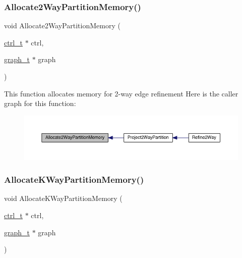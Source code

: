 \subsubsection{\texorpdfstring{Allocate2\+Way\+Partition\+Memory()}{Allocate2WayPartitionMemory()}}
{\footnotesize\ttfamily void Allocate2\+Way\+Partition\+Memory (\begin{DoxyParamCaption}\item[{\hyperlink{a00742}{ctrl\+\_\+t} $\ast$}]{ctrl,  }\item[{\hyperlink{a00734}{graph\+\_\+t} $\ast$}]{graph }\end{DoxyParamCaption})}

This function allocates memory for 2-\/way edge refinement Here is the caller graph for this function\+:\nopagebreak
\begin{figure}[H]
\begin{center}
\leavevmode
\includegraphics[width=350pt]{a00945_aadcb666600c1f5ded03cdd998b6ffd8f_icgraph}
\end{center}
\end{figure}
\mbox{\label{a00945_a22a23a687ef7ed0d4f66ab58e3a81d12}} 
\subsubsection{\texorpdfstring{Allocate\+K\+Way\+Partition\+Memory()}{AllocateKWayPartitionMemory()}}
{\footnotesize\ttfamily void Allocate\+K\+Way\+Partition\+Memory (\begin{DoxyParamCaption}\item[{\hyperlink{a00742}{ctrl\+\_\+t} $\ast$}]{ctrl,  }\item[{\hyperlink{a00734}{graph\+\_\+t} $\ast$}]{graph }\end{DoxyParamCaption})}

